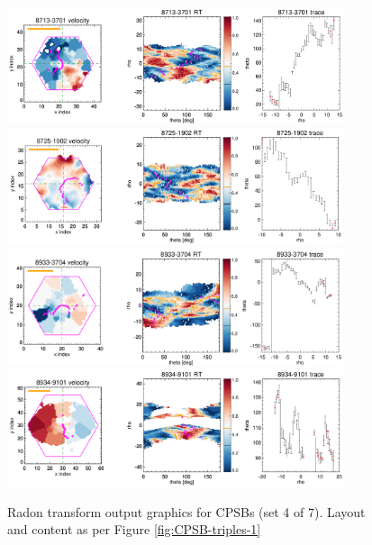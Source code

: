 \documentclass[fleqn,usenatbib]{mnras}
\begin{document}
\begin{figure}
    \centering
    \includegraphics[width=0.88\textwidth]{Images/SN1-MC250/CPSB-triples/CPSB-8713-3701-1-250.png}
    \includegraphics[width=0.88\textwidth]{Images/SN1-MC250/CPSB-triples/CPSB-8725-1902-1-250.png}
    \includegraphics[width=0.88\textwidth]{Images/SN1-MC250/CPSB-triples/CPSB-8933-3704-1-250.png}
    \includegraphics[width=0.88\textwidth]{Images/SN1-MC250/CPSB-triples/CPSB-8934-9101-1-250.png}    
    \caption{Radon transform output graphics for CPSBs (set 4 of 7). Layout and content as per Figure \ref{fig:CPSB-triples-1}}
    \label{fig:CPSB-triples-4}
\end{figure}
\end{document}
